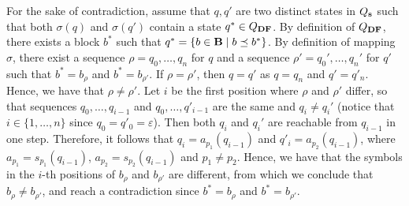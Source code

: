 For the sake of contradiction, assume that
$q,q'$ are two distinct states in $Q_{\mathbf{s}}$ such that both $\sigma(q)$ and $\sigma(q')$ contain a state $q^* \in Q_{\text{\rm {\bf DF}}}$. By definition of $Q_{\text{\rm {\bf DF}}}$, there exists a block 
$b^*$ such that $q^* = \{b \in \mathbf{B} \mid b \preceq b^*\}$.
By definition of mapping $\sigma$, there exist a sequence $\rho = q_0,\dots,q_n$ for $q$ and a sequence $\rho' = q_0',\dots,q_n'$ for $q'$ such that $b^* = b_\rho$ and $b^* = b_{\rho'}$. If 
$\rho = \rho'$, then $q = q'$ as $q = q_n$ and $q' = q'_n$. Hence, we have that $\rho \neq \rho'$.
Let $i$ be the first position where $\rho$ and $\rho'$ differ,
so that 
sequences $q_0,\dots,q_{i-1}$ and $q_0,\dots,q'_{i-1}$ are the same and $q_i \neq q_i'$ (notice that $i \in \{1, \ldots, n\}$ since $q_0 = q'_0 = \varepsilon$).
Then both $q_i$ and $q_i'$ are reachable from $q_{i-1}$ in one step. Therefore, it follows that 
$q_i = a_{p_1}(q_{i-1})$ and $q'_i = a_{p_2}(q_{i-1})$, where $a_{p_1} = s_{p_1}(q_{i-1})$, $a_{p_2} = s_{p_2}(q_{i-1})$ and $p_1 \neq p_2$. Hence, we have that the symbols in the $i$-th positions of $b_\rho$ and $b_{\rho'}$ are different, from which we conclude that $b_\rho \neq b_{\rho'}$, and reach a contradiction since $b^* = b_\rho$ and $b^* = b_{\rho'}$.



